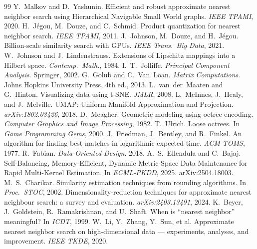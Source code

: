 \documentclass[11pt]{article}
\begin{document}
\begin{thebibliography}{99}
 Y.~Malkov and D.~Yashunin. Efficient and robust approximate nearest
neighbor search using Hierarchical Navigable Small World graphs. \emph{IEEE TPAMI},
2020.
 H.~J\'egou, M.~Douze, and C.~Schmid. Product quantization for
nearest neighbor search. \emph{IEEE TPAMI}, 2011.
 J.~Johnson, M.~Douze, and H.~J\'egou. Billion-scale similarity
search with GPUs. \emph{IEEE Trans.\ Big Data}, 2021.
 W.~Johnson and J.~Lindenstrauss. Extensions of Lipschitz mappings into
a Hilbert space. \emph{Contemp.\ Math.}, 1984.
 I.~T.~Jolliffe. \emph{Principal Component Analysis}. Springer, 2002.
 G.~Golub and C.~Van~Loan. \emph{Matrix Computations}. Johns
Hopkins University Press, 4th ed., 2013.
 L.~van~der~Maaten and G.~Hinton. Visualizing data using t-SNE.
\emph{JMLR}, 2008.
 L.~McInnes, J.~Healy, and J.~Melville. UMAP: Uniform Manifold
Approximation and Projection. \emph{arXiv:1802.03426}, 2018.
 D.~Meagher. Geometric modeling using octree encoding.
\emph{Computer Graphics and Image Processing}, 1982.
 T.~Ulrich. Loose octrees. In \emph{Game Programming Gems}, 2000.
 J.~Friedman, J.~Bentley, and R.~Finkel. An algorithm for finding
best matches in logarithmic expected time. \emph{ACM TOMS}, 1977.
 R.~Fabian. \emph{Data-Oriented Design}. 2018.
 A.~S.~Ellendula and C.~Bajaj. Self-Balancing, Memory-Efficient,
Dynamic Metric-Space Data Maintenance for Rapid Multi-Kernel Estimation. In
\emph{ECML-PKDD}, 2025. arXiv:2504.18003.
 M.~S.~Charikar. Similarity estimation techniques from rounding
algorithms. In \emph{Proc.\ STOC}, 2002.
 Dimensionality-reduction techniques for approximate nearest
neighbour search: a survey and evaluation. \emph{arXiv:2403.13491}, 2024.
 K.~Beyer, J.~Goldstein, R.~Ramakrishnan, and U.~Shaft. When is
``nearest neighbor'' meaningful? In \emph{ICDT}, 1999.
 W.~Li, Y.~Zhang, Y.~Sun, et al. Approximate nearest neighbor
search on high-dimensional data --- experiments, analyses, and improvement.
\emph{IEEE TKDE}, 2020.
\end{thebibliography}
\end{document}
